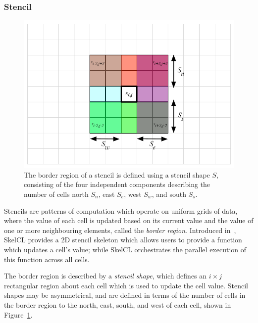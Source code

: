 \subsubsection{Stencil}

\begin{figure}
\centering
\includegraphics[width=.6\textwidth]{img/stencil-shape}
\caption[Stencil border region]{%
  The border region of a stencil is defined using a stencil shape $S$,
  consisting of the four independent components describing the number
  of cells north $S_n$, east $S_e$, west $S_w$, and south $S_s$.%
}
\label{fig:stencil-shape}
\end{figure}

Stencils are patterns of computation which operate on uniform grids of
data, where the value of each cell is updated based on its current
value and the value of one or more neighbouring elements, called the
\emph{border region}. Introduced in~\cite{Breuer2014}, SkelCL provides
a 2D stencil skeleton which allows users to provide a function which
updates a cell's value; while SkelCL orchestrates the parallel
execution of this function across all cells.

The border region is described by a \emph{stencil shape}, which
defines an $i \times j$ rectangular region about each cell which is
used to update the cell value. Stencil shapes may be asymmetrical, and
are defined in terms of the number of cells in the border region to
the north, east, south, and west of each cell, shown in
Figure~\ref{fig:stencil-shape}.

